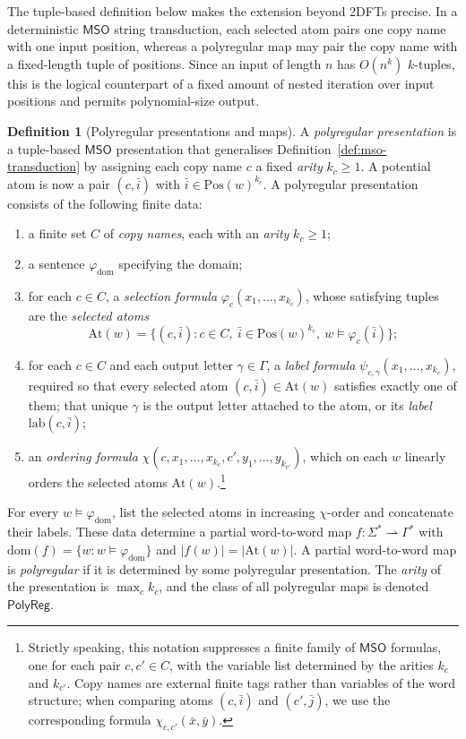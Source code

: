 \documentclass[11pt]{article}
\theoremstyle{definition}
\newtheorem{definition}[theorem]{Definition}
\newcommand{\MSO}{\mathsf{MSO}}
\newcommand{\polyreg}{\mathsf{PolyReg}}
\begin{document}
The tuple-based definition below makes the extension beyond 2DFTs precise.  In
a deterministic $\MSO$ string transduction, each selected atom pairs one copy
name with one input position, whereas a polyregular map may pair the copy name
with a fixed-length tuple of positions.  Since an input of length $n$ has $O(n^k)$
$k$-tuples, this is the logical counterpart of a fixed amount of nested
iteration over input positions and permits polynomial-size output.

\begin{definition}[Polyregular presentations and maps]
\label{def:polyregular}
A \emph{polyregular presentation} is a tuple-based $\MSO$ presentation that
generalises Definition~\ref{def:mso-transduction} by assigning each copy name $c$
a fixed \emph{arity} $k_c\ge 1$.  A potential atom is now a pair
$(c,\bar i)$ with $\bar i\in\mathrm{Pos}(w)^{k_c}$.  A polyregular
presentation consists of the following finite data:
\begin{enumerate}[label=(\roman*)]
\item a finite set $C$ of \emph{copy names}, each with an \emph{arity}
$k_c\ge 1$;
\item a sentence $\varphi_{\mathrm{dom}}$ specifying the domain;
\item for each $c\in C$, a \emph{selection formula}
$\varphi_c(x_1,\ldots,x_{k_c})$, whose satisfying tuples are the \emph{selected
atoms}
\[
   \mathrm{At}(w)
   =\{(c,\bar i):c\in C,\ \bar i\in\mathrm{Pos}(w)^{k_c},
     \ w\models\varphi_c(\bar i)\};
\]
\item for each $c\in C$ and each output letter $\gamma\in\Gamma$, a
\emph{label formula} $\psi_{c,\gamma}(x_1,\ldots,x_{k_c})$, required so that
every selected atom $(c,\bar i)\in\mathrm{At}(w)$ satisfies exactly one of them;
that unique $\gamma$ is the output letter attached to the atom, or its
\emph{label} $\mathrm{lab}(c,\bar i)$;
\item an \emph{ordering formula}
$\chi(c,x_1,\ldots,x_{k_c},c',y_1,\ldots,y_{k_{c'}})$, which on each $w$
linearly orders the selected atoms $\mathrm{At}(w)$.\footnote{Strictly speaking,
this notation suppresses a finite family of $\MSO$ formulas, one for each pair
$c,c'\in C$, with the variable list determined by the arities $k_c$ and
$k_{c'}$.  Copy names are external finite tags rather than variables of the
word structure; when comparing atoms $(c,\bar i)$ and $(c',\bar j)$, we use the
corresponding formula $\chi_{c,c'}(\bar x,\bar y)$.}
\end{enumerate}
For every $w\models\varphi_{\mathrm{dom}}$, list the selected atoms in increasing
$\chi$-order and concatenate their labels.  These data determine a partial
word-to-word map $f\colon\Sigma^*\rightharpoonup\Gamma^*$ with
$\mathrm{dom}(f)=\{w:w\models\varphi_{\mathrm{dom}}\}$ and
$|f(w)|=|\mathrm{At}(w)|$.  A partial word-to-word map is \emph{polyregular}
if it is determined by some polyregular presentation.  The \emph{arity} of the
presentation is $\max_c k_c$, and the class of all polyregular maps is denoted
$\polyreg$.
\end{definition}
\end{document}
